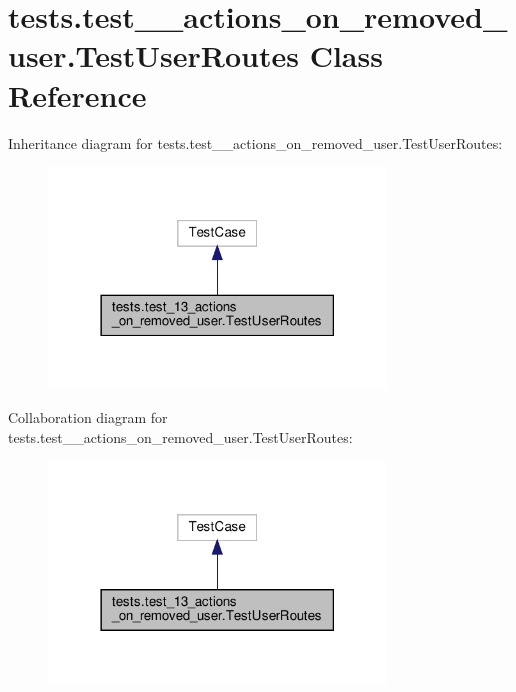 \hypertarget{classtests_1_1test__13__actions__on__removed__user_1_1_test_user_routes}{}\section{tests.\+test\+\_\+\_\+actions\+\_\+on\+\_\+removed\+\_\+user.\+Test\+User\+Routes Class Reference}
\label{classtests_1_1test__13__actions__on__removed__user_1_1_test_user_routes}


Inheritance diagram for tests.\+test\+\_\+\_\+actions\+\_\+on\+\_\+removed\+\_\+user.\+Test\+User\+Routes\+:
\nopagebreak
\begin{figure}[H]
\begin{center}
\leavevmode
\includegraphics[width=254pt]{classtests_1_1test__13__actions__on__removed__user_1_1_test_user_routes__inherit__graph}
\end{center}
\end{figure}


Collaboration diagram for tests.\+test\+\_\+\_\+actions\+\_\+on\+\_\+removed\+\_\+user.\+Test\+User\+Routes\+:
\nopagebreak
\begin{figure}[H]
\begin{center}
\leavevmode
\includegraphics[width=254pt]{classtests_1_1test__13__actions__on__removed__user_1_1_test_user_routes__coll__graph}
\end{center}
\end{figure}

